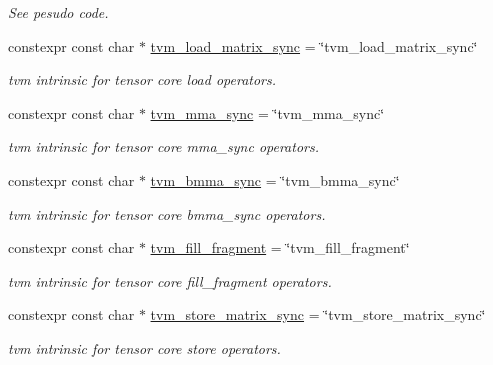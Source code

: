 \begin{DoxyCompactItemize}
\begin{DoxyCompactList}\small\item\em See pesudo code. \end{DoxyCompactList}\item 
constexpr const char $\ast$ \hyperlink{namespacetvm_1_1tir_1_1intrinsic_a8ec923ea4f1dad1fbbd4962684bd9b51}{tvm\+\_\+load\+\_\+matrix\+\_\+sync} = \char`\"{}tvm\+\_\+load\+\_\+matrix\+\_\+sync\char`\"{}
\begin{DoxyCompactList}\small\item\em tvm intrinsic for tensor core load operators. \end{DoxyCompactList}\item 
constexpr const char $\ast$ \hyperlink{namespacetvm_1_1tir_1_1intrinsic_aa78302097030bd1c144b826db84defdc}{tvm\+\_\+mma\+\_\+sync} = \char`\"{}tvm\+\_\+mma\+\_\+sync\char`\"{}
\begin{DoxyCompactList}\small\item\em tvm intrinsic for tensor core mma\+\_\+sync operators. \end{DoxyCompactList}\item 
constexpr const char $\ast$ \hyperlink{namespacetvm_1_1tir_1_1intrinsic_a4d1287729e05d683af059be0faaf9014}{tvm\+\_\+bmma\+\_\+sync} = \char`\"{}tvm\+\_\+bmma\+\_\+sync\char`\"{}
\begin{DoxyCompactList}\small\item\em tvm intrinsic for tensor core bmma\+\_\+sync operators. \end{DoxyCompactList}\item 
constexpr const char $\ast$ \hyperlink{namespacetvm_1_1tir_1_1intrinsic_a6c0862848e3eb5b6972c76f0b27585f9}{tvm\+\_\+fill\+\_\+fragment} = \char`\"{}tvm\+\_\+fill\+\_\+fragment\char`\"{}
\begin{DoxyCompactList}\small\item\em tvm intrinsic for tensor core fill\+\_\+fragment operators. \end{DoxyCompactList}\item 
constexpr const char $\ast$ \hyperlink{namespacetvm_1_1tir_1_1intrinsic_a3127cfee7b97ef7182019e69b7a3eb78}{tvm\+\_\+store\+\_\+matrix\+\_\+sync} = \char`\"{}tvm\+\_\+store\+\_\+matrix\+\_\+sync\char`\"{}
\begin{DoxyCompactList}\small\item\em tvm intrinsic for tensor core store operators. \end{DoxyCompactList}\end{DoxyCompactItemize}


